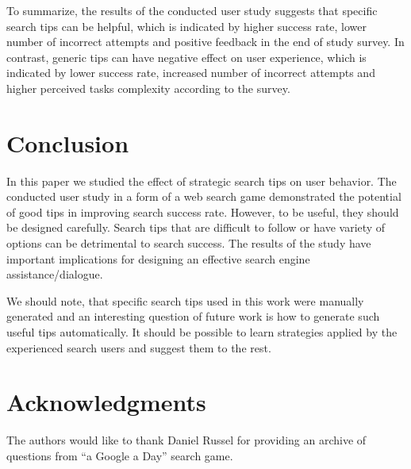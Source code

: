 \documentclass{sig-alternate}
\begin{document}
To summarize, the results of the conducted user study suggests that specific search tips can be helpful, which is indicated by higher success rate, lower number of incorrect attempts and positive feedback in the end of study survey.
In contrast, generic tips can have negative effect on user experience, which is indicated by lower success rate, increased number of incorrect attempts and higher perceived tasks complexity according to the survey.

\section{Conclusion}
In this paper we studied the effect of strategic search tips on user behavior. 
The conducted user study in a form of a web search game demonstrated the potential of good tips in improving search success rate.
However, to be useful, they should be designed carefully.
Search tips that are difficult to follow or have variety of options can be detrimental to search success.
The results of the study have important implications for designing an effective search engine assistance/dialogue.

We should note, that specific search tips used in this work were manually generated and an interesting question of future work is how to generate such useful tips automatically.
It should be possible to learn strategies applied by the experienced search users and suggest them to the rest.


\section{Acknowledgments}
The authors would like to thank Daniel Russel for providing an archive of questions from ``a Google a Day'' search game.

%

%
%
\end{document}
